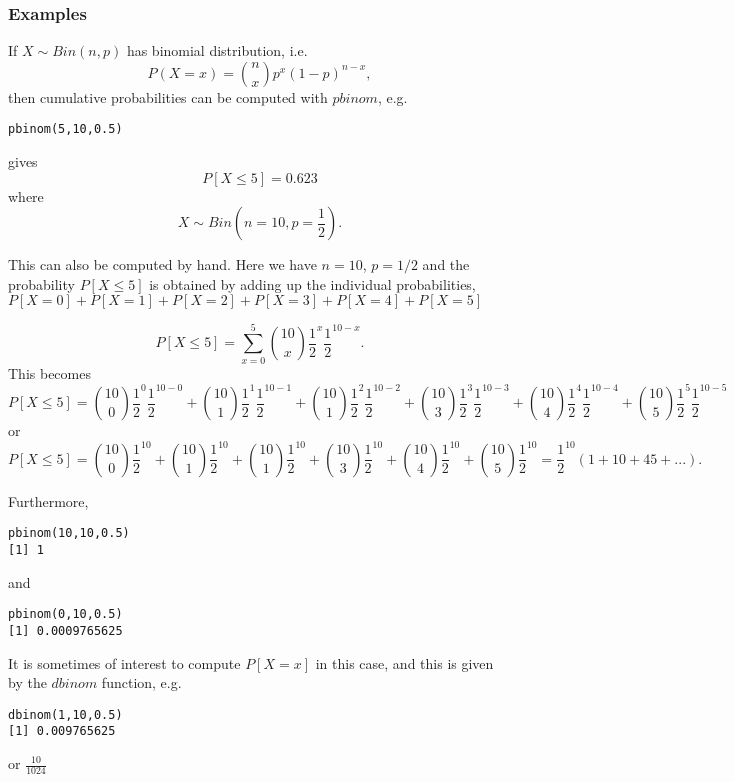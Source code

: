 \documentclass[12pt,a4paper]{article}
\theoremstyle{regla}
\theoremstyle{remark}
\theoremstyle{definition}
\theoremstyle{nonumberbreak}
\begin{document}
\subsubsection{Examples}
\begin{xmpl}

If $X \sim Bin(n,p)$ has binomial distribution, i.e.
$$ P(X = x) = {n \choose x}p^x(1-p)^{n-x},$$
then cumulative probabilities can be computed with $pbinom$, e.g.
\begin{lstlisting}
pbinom(5,10,0.5) 
\end{lstlisting} 

gives  $$P[X \leq 5] = 0.623$$
where $$X \sim Bin(n=10,p= \frac{1}{2}).$$

This can also be computed by hand. Here we have $n=10$, $p=1/2$ and the probability 
$P[X \leq 5] $ is obtained by adding up the individual probabilities, 
$P[X =0]+P[X =1]+P[X =2]+P[X =3]+P[X =4]+P[X =5]$ 

$$
P[X \leq 5]  = \sum_{x=0}^5 {10\choose x} \frac{1}{2}^x\frac{1}{2}^{10-x}.
$$
This becomes
$$
P[X \leq 5]  = {10\choose 0} \frac{1}{2}^0\frac{1}{2}^{10-0} +{10\choose 1} \frac{1}{2}^1\frac{1}{2}^{10-1}+{10\choose 1} \frac{1}{2}^2\frac{1}{2}^{10-2}+{10\choose 3} \frac{1}{2}^3\frac{1}{2}^{10-3}+{10\choose 4} \frac{1}{2}^4\frac{1}{2}^{10-4}+{10\choose 5} \frac{1}{2}^5\frac{1}{2}^{10-5}
$$
or
$$
P[X \leq 5]  = {10\choose 0} \frac{1}{2}^{10} +{10\choose 1} \frac{1}{2}^{10}+{10\choose 1} \frac{1}{2}^{10}+{10\choose 3} \frac{1}{2}^{10}+{10\choose 4} \frac{1}{2}^{10}+{10\choose 5} \frac{1}{2}^{10}=\frac{1}{2}^{10} \left(1+10+45+...\right).
$$


Furthermore,
\begin{lstlisting} 
pbinom(10,10,0.5)
[1] 1
\end{lstlisting}
and
\begin{lstlisting} 
pbinom(0,10,0.5) 
[1] 0.0009765625
\end{lstlisting}



It is sometimes of interest to compute $P[X=x]$ in this case, and this is given by the $dbinom$ function, e.g.

\begin{lstlisting} 
dbinom(1,10,0.5)
[1] 0.009765625
\end{lstlisting}

or $ \frac{10}{1024}$

\end{xmpl}
\end{document}
